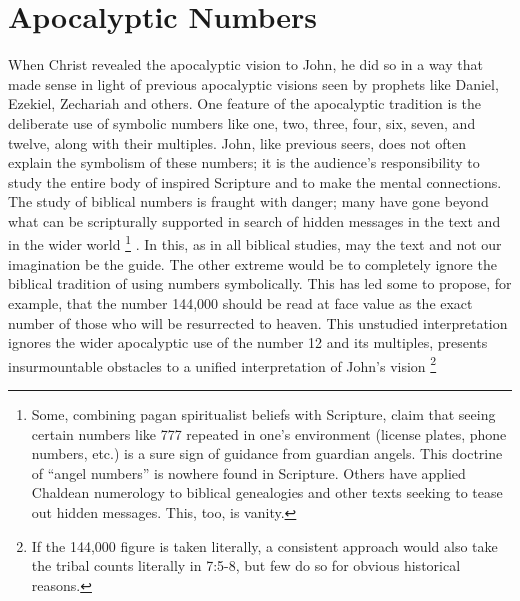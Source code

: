 \backmatter
\appendix
\cleartorecto
\appendixpage
\onecolumn
\setcounter{footnote}{0}
\chapter*{Apocalyptic Numbers}
\fancyhead{} %

When Christ revealed the apocalyptic vision to John, he did so in a way that made sense in light of previous 
apocalyptic visions seen by prophets like Daniel, Ezekiel, Zechariah and others. One feature of the apocalyptic 
tradition is the deliberate use of symbolic numbers like one, two, three, four, six, seven, and twelve, along with their multiples. 
John, like previous seers, does not often explain the symbolism of these numbers; it is the audience's 
responsibility to study the entire body of inspired Scripture and to make the mental connections. 
\newline\newline
The study of biblical numbers is fraught with danger; many have gone beyond what can be scripturally supported in search of hidden messages in the text and in the wider world%
\footnote{Some, combining pagan spiritualist beliefs with Scripture, claim that seeing certain numbers like 777 repeated in one's environment (license plates, phone numbers, etc.) is a sure sign of guidance from guardian angels. This doctrine of ``angel numbers'' is nowhere found in Scripture. Others have applied Chaldean numerology to biblical genealogies and other texts seeking to tease out hidden messages. This, too, is vanity.}%
. In this, as in all biblical studies, may the text and not our imagination be the guide. The other extreme would be to completely ignore the biblical tradition of using numbers symbolically. This has led some to propose, for example, that the number 144,000 should be read at face value as the exact number of those who will be resurrected to heaven. This unstudied interpretation ignores the wider apocalyptic use of the number 12 and its multiples, presents insurmountable obstacles to a unified interpretation of John's vision%
\footnote{If the 144,000 figure is taken literally, a consistent approach would also take the tribal counts literally in 7:5-8, but few do so for obvious historical reasons.} %

